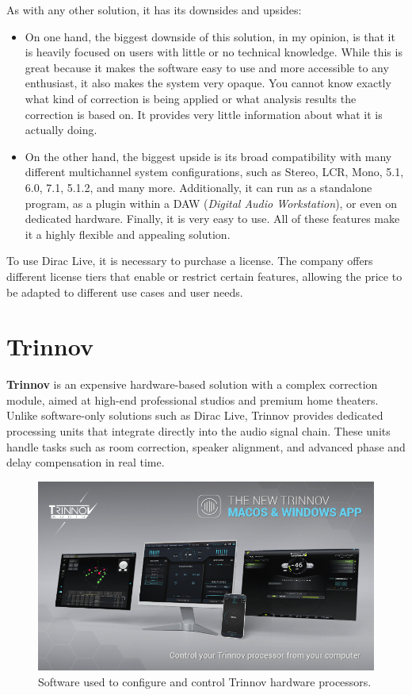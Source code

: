 As with any other solution, it has its downsides and upsides:

\begin{itemize}
	\item On one hand, the biggest downside of this solution, in my opinion, is that it is heavily focused on users with little or no technical knowledge. While this is great because it makes the software easy to use and more accessible to any enthusiast, it also makes the system very opaque. You cannot know exactly what kind of correction is being applied or what analysis results the correction is based on. It provides very little information about what it is actually doing.
	
	\item On the other hand, the biggest upside is its broad compatibility with many different multichannel system configurations, such as Stereo, LCR, Mono, 5.1, 6.0, 7.1, 5.1.2, and many more. Additionally, it can run as a standalone program, as a plugin within a DAW (\textit{Digital Audio Workstation}), or even on dedicated hardware. Finally, it is very easy to use. All of these features make it a highly flexible and appealing solution.
\end{itemize}

To use Dirac Live, it is necessary to purchase a license. The company offers different license tiers that enable or restrict certain features, allowing the price to be adapted to different use cases and user needs.


\section{Trinnov}

\textbf{Trinnov}\cite{trinnov} is an expensive hardware-based solution with a complex correction module, aimed at high-end professional studios and premium home theaters. Unlike software-only solutions such as Dirac Live, Trinnov provides dedicated processing units that integrate directly into the audio signal chain. These units handle tasks such as room correction, speaker alignment, and advanced phase and delay compensation in real time.

\begin{figure}[H]
	\centering
	\includegraphics[width=0.9
	\linewidth]{Figures/trinnov_soft.png}
	\caption{Software used to configure and control Trinnov hardware processors.}
	\label{fig:trinnov_soft}
\end{figure}

